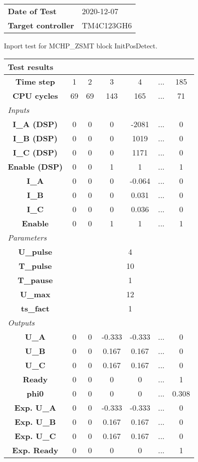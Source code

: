 \begin{tabular}{l l}
\textbf{Date of Test} & 2020-12-07 \tabularnewline
\textbf{Target controller} & TM4C123GH6 \tabularnewline
\end{tabular}
\vspace{1ex}
Inport test for MCHP_ZSMT block InitPosDetect.

\vspace{1em}
\begin{tabularx}{\textwidth}{|c|c|c|c|c|>{\centering\arraybackslash}X|c|}
\hline
\multicolumn{7}{|l|}{\cellcolor[gray]{0.8}\textbf{Test results}} \tabularnewline \hline
\textbf{Time step} & 1 & 2 & 3 & 4 & ... & 185 \tabularnewline \hline
\textbf{CPU cycles} & 69 & 69 & 143 & 165 & ... & 71 \tabularnewline \hline
\multicolumn{7}{|l|}{\cellcolor[gray]{0.9}\textit{Inputs}} \tabularnewline \hline
\textbf{I\_A (DSP)} & 0 & 0 & 0 & -2081 & ... & 0 \tabularnewline \hline
\textbf{I\_B (DSP)} & 0 & 0 & 0 & 1019 & ... & 0 \tabularnewline \hline
\textbf{I\_C (DSP)} & 0 & 0 & 0 & 1171 & ... & 0 \tabularnewline \hline
\textbf{Enable (DSP)} & 0 & 0 & 1 & 1 & ... & 1 \tabularnewline \hline
\textbf{I\_A} & 0 & 0 & 0 & -0.064 & ... & 0 \tabularnewline \hline
\textbf{I\_B} & 0 & 0 & 0 & 0.031 & ... & 0 \tabularnewline \hline
\textbf{I\_C} & 0 & 0 & 0 & 0.036 & ... & 0 \tabularnewline \hline
\textbf{Enable} & 0 & 0 & 1 & 1 & ... & 1 \tabularnewline \hline
\multicolumn{7}{|l|}{\cellcolor[gray]{0.9}\textit{Parameters}} \tabularnewline \hline
\textbf{U\_pulse} & \multicolumn{6}{c|}{4} \tabularnewline \hline
\textbf{T\_pulse} & \multicolumn{6}{c|}{10} \tabularnewline \hline
\textbf{T\_pause} & \multicolumn{6}{c|}{1} \tabularnewline \hline
\textbf{U\_max} & \multicolumn{6}{c|}{12} \tabularnewline \hline
\textbf{ts\_fact} & \multicolumn{6}{c|}{1} \tabularnewline \hline
\multicolumn{7}{|l|}{\cellcolor[gray]{0.9}\textit{Outputs}} \tabularnewline \hline
\textbf{U\_A} & 0 & 0 & -0.333 & -0.333 & ... & 0 \tabularnewline \hline
\textbf{U\_B} & 0 & 0 & 0.167 & 0.167 & ... & 0 \tabularnewline \hline
\textbf{U\_C} & 0 & 0 & 0.167 & 0.167 & ... & 0 \tabularnewline \hline
\textbf{Ready} & 0 & 0 & 0 & 0 & ... & 1 \tabularnewline \hline
\textbf{phi0} & 0 & 0 & 0 & 0 & ... & 0.308 \tabularnewline \hline
\textbf{Exp. U\_A} & 0 & 0 & -0.333 & -0.333 & ... & 0 \tabularnewline \hline
\textbf{Exp. U\_B} & 0 & 0 & 0.167 & 0.167 & ... & 0 \tabularnewline \hline
\textbf{Exp. U\_C} & 0 & 0 & 0.167 & 0.167 & ... & 0 \tabularnewline \hline
\textbf{Exp. Ready} & 0 & 0 & 0 & 0 & ... & 1 \tabularnewline \hline

\end{tabularx}
